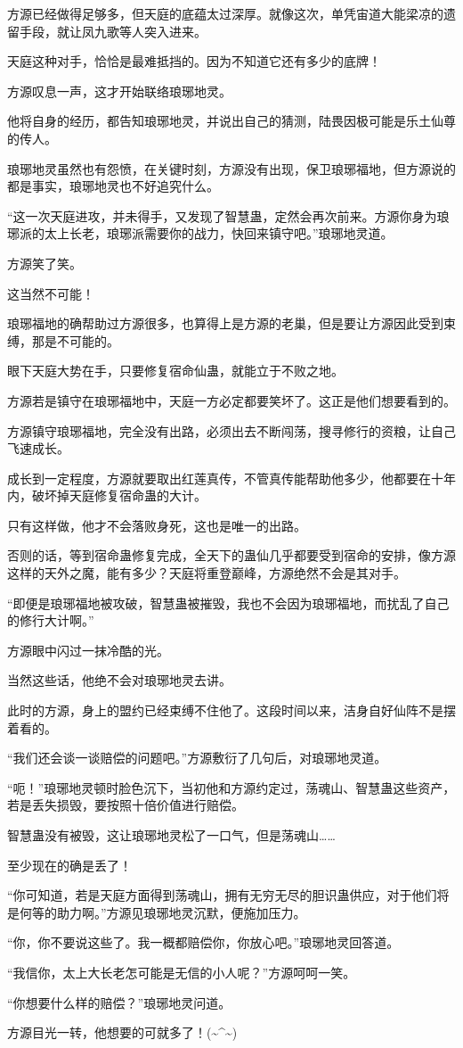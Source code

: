 \begin{this_body}
方源已经做得足够多，但天庭的底蕴太过深厚。就像这次，单凭宙道大能梁凉的遗留手段，就让凤九歌等人突入进来。

天庭这种对手，恰恰是最难抵挡的。因为不知道它还有多少的底牌！

方源叹息一声，这才开始联络琅琊地灵。

他将自身的经历，都告知琅琊地灵，并说出自己的猜测，陆畏因极可能是乐土仙尊的传人。

琅琊地灵虽然也有怨愤，在关键时刻，方源没有出现，保卫琅琊福地，但方源说的都是事实，琅琊地灵也不好追究什么。

“这一次天庭进攻，并未得手，又发现了智慧蛊，定然会再次前来。方源你身为琅琊派的太上长老，琅琊派需要你的战力，快回来镇守吧。”琅琊地灵道。

方源笑了笑。

这当然不可能！

琅琊福地的确帮助过方源很多，也算得上是方源的老巢，但是要让方源因此受到束缚，那是不可能的。

眼下天庭大势在手，只要修复宿命仙蛊，就能立于不败之地。

方源若是镇守在琅琊福地中，天庭一方必定都要笑坏了。这正是他们想要看到的。

方源镇守琅琊福地，完全没有出路，必须出去不断闯荡，搜寻修行的资粮，让自己飞速成长。

成长到一定程度，方源就要取出红莲真传，不管真传能帮助他多少，他都要在十年内，破坏掉天庭修复宿命蛊的大计。

只有这样做，他才不会落败身死，这也是唯一的出路。

否则的话，等到宿命蛊修复完成，全天下的蛊仙几乎都要受到宿命的安排，像方源这样的天外之魔，能有多少？天庭将重登巅峰，方源绝然不会是其对手。

“即便是琅琊福地被攻破，智慧蛊被摧毁，我也不会因为琅琊福地，而扰乱了自己的修行大计啊。”

方源眼中闪过一抹冷酷的光。

当然这些话，他绝不会对琅琊地灵去讲。

此时的方源，身上的盟约已经束缚不住他了。这段时间以来，洁身自好仙阵不是摆着看的。

“我们还会谈一谈赔偿的问题吧。”方源敷衍了几句后，对琅琊地灵道。

“呃！”琅琊地灵顿时脸色沉下，当初他和方源约定过，荡魂山、智慧蛊这些资产，若是丢失损毁，要按照十倍价值进行赔偿。

智慧蛊没有被毁，这让琅琊地灵松了一口气，但是荡魂山……

至少现在的确是丢了！

“你可知道，若是天庭方面得到荡魂山，拥有无穷无尽的胆识蛊供应，对于他们将是何等的助力啊。”方源见琅琊地灵沉默，便施加压力。

“你，你不要说这些了。我一概都赔偿你，你放心吧。”琅琊地灵回答道。

“我信你，太上大长老怎可能是无信的小人呢？”方源呵呵一笑。

“你想要什么样的赔偿？”琅琊地灵问道。

方源目光一转，他想要的可就多了！(\~{}\^{}\~{})

\end{this_body}

